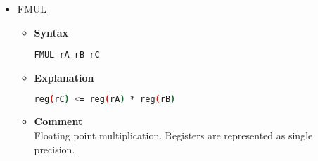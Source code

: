 \begin{itemize}
    \item FMUL
    \begin{itemize}
        \item \textbf{Syntax}
        \begin{lstlisting}[language={[markII]Assembler}, frame=single]
    FMUL rA rB rC
        \end{lstlisting}
        \item \textbf{Explanation}
        \begin{lstlisting}[language=bash, frame=single]
    reg(rC) <= reg(rA) * reg(rB)
        \end{lstlisting}
        \item \textbf{Comment} \\
        Floating point multiplication. Registers are represented as single precision.
    \end{itemize}

\end{itemize}
